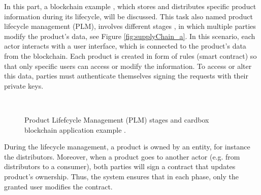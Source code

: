 In this part, a blockchain example \citep{abeyratne2016blockchain}, which stores and distributes specific product information during its lifecycle, will be discussed. This task also named product lifecycle management (PLM), involves different stages \citep{stark2015product}, in which multiple parties modify the product's data, see Figure \ref{fig:supplyChain_a}. In this scenario, each actor interacts with a user interface, which is connected to the product's data from the blockchain. Each product is created in form of rules (smart contract) so that only specific users can access or modify the information. To access or alter this data, parties must authenticate themselves signing the requests with their private keys. 

\begin{figure}[bth]
	\myfloatalign
	 \quad
	 \\
	\caption{Product Lifefcycle Management (PLM) stages and cardbox blockchain application example \citep{stark2015product}.}
	\label{fig:supplyChain}
\end{figure}

During the lifecycle management, a product is owned by an entity, for instance the distributors. Moreover, when a product goes to another actor (e.g. from distributors to a consumer), both parties will sign a contract that updates product's ownership. Thus, the system ensures that in each phase, only the granted user modifies the contract.

